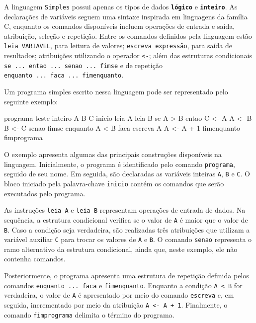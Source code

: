 \documentclass[
  brazilian,
  letterpaper,
]{book}
\newenvironment{Shaded}{\begin{snugshade}}{\end{snugshade}}
\newcommand{\NormalTok}[1]{\textcolor[rgb]{0.00,0.23,0.31}{#1}}
\theoremstyle{plain}
\theoremstyle{definition}
\theoremstyle{remark}
\begin{document}
A linguagem \texttt{Simples} possui apenas os tipos de dados
\textbf{\texttt{lógico}} e \textbf{\texttt{inteiro}}. As declarações de
variáveis seguem uma sintaxe inspirada em linguagens da família C,
enquanto os comandos disponíveis incluem operações de entrada e saída,
atribuição, seleção e repetição. Entre os comandos definidos pela
linguagem estão \texttt{leia\ VARIAVEL}, para leitura de valores;
\texttt{escreva\ expressão}, para saída de resultados; atribuições
utilizando o operador \texttt{\textless{}-}; além das estruturas
condicionais \texttt{se\ ...\ entao\ ...\ senao\ ...\ fimse} e de
repetição \texttt{enquanto\ ...\ faca\ ...\ fimenquanto}.

Um programa simples escrito nessa linguagem pode ser representado pelo
seguinte exemplo:

\begin{Shaded}
\begin{Highlighting}[]
\NormalTok{programa teste}
\NormalTok{   inteiro A B C }
\NormalTok{inicio}
\NormalTok{   leia A}
\NormalTok{   leia B}
\NormalTok{   se A \textgreater{} B }
\NormalTok{      entao C \textless{}{-} A}
\NormalTok{            A \textless{}{-} B }
\NormalTok{            B \textless{}{-} C }
\NormalTok{      senao }
\NormalTok{   fimse}
\NormalTok{   enquanto A \textless{} B faca}
\NormalTok{      escreva A}
\NormalTok{      A \textless{}{-} A + 1}
\NormalTok{   fimenquanto}
\NormalTok{fimprograma}
\end{Highlighting}
\end{Shaded}

O exemplo apresenta algumas das principais construções disponíveis na
linguagem. Inicialmente, o programa é identificado pelo comando
\texttt{programa}, seguido de seu nome. Em seguida, são declaradas as
variáveis inteiras \texttt{A}, \texttt{B} e \texttt{C}. O bloco iniciado
pela palavra-chave \texttt{inicio} contém os comandos que serão
executados pelo programa.

As instruções \texttt{leia\ A} e \texttt{leia\ B} representam operações
de entrada de dados. Na sequência, a estrutura condicional verifica se o
valor de \texttt{A} é maior que o valor de \texttt{B}. Caso a condição
seja verdadeira, são realizadas três atribuições que utilizam a variável
auxiliar \texttt{C} para trocar os valores de \texttt{A} e \texttt{B}. O
comando \texttt{senao} representa o ramo alternativo da estrutura
condicional, ainda que, neste exemplo, ele não contenha comandos.

Posteriormente, o programa apresenta uma estrutura de repetição definida
pelos comandos \texttt{enquanto\ ...\ faca} e \texttt{fimenquanto}.
Enquanto a condição \texttt{A\ \textless{}\ B} for verdadeira, o valor
de \texttt{A} é apresentado por meio do comando \texttt{escreva} e, em
seguida, incrementado por meio da atribuição
\texttt{A\ \textless{}-\ A\ +\ 1}. Finalmente, o comando
\texttt{fimprograma} delimita o término do programa.
\end{document}
